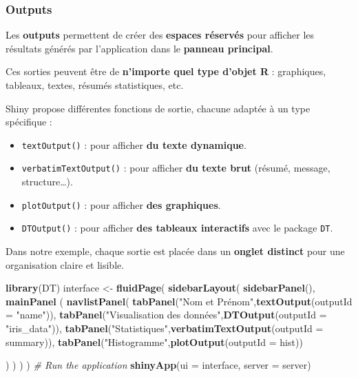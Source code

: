 \documentclass[
]{article}
\newenvironment{Shaded}{\begin{snugshade}}{\end{snugshade}}
\newcommand{\AttributeTok}[1]{\textcolor[rgb]{0.13,0.29,0.53}{#1}}
\newcommand{\CommentTok}[1]{\textcolor[rgb]{0.56,0.35,0.01}{\textit{#1}}}
\newcommand{\FunctionTok}[1]{\textcolor[rgb]{0.13,0.29,0.53}{\textbf{#1}}}
\newcommand{\NormalTok}[1]{#1}
\newcommand{\OtherTok}[1]{\textcolor[rgb]{0.56,0.35,0.01}{#1}}
\newcommand{\StringTok}[1]{\textcolor[rgb]{0.31,0.60,0.02}{#1}}
\providecommand{\tightlist}{%
  \setlength{\itemsep}{0pt}\setlength{\parskip}{0pt}}
\begin{document}
\subsubsection{Outputs}\label{outputs}

Les \textbf{outputs} permettent de créer des \textbf{espaces réservés}
pour afficher les résultats générés par l'application dans le
\textbf{panneau principal}.

Ces sorties peuvent être de \textbf{n'importe quel type d'objet R} :
graphiques, tableaux, textes, résumés statistiques, etc.

Shiny propose différentes fonctions de sortie, chacune adaptée à un type
spécifique :

\begin{itemize}
\tightlist
\item
  \texttt{textOutput()} : pour afficher \textbf{du texte dynamique}.\\
\item
  \texttt{verbatimTextOutput()} : pour afficher \textbf{du texte brut}
  (résumé, message, structure\ldots).\\
\item
  \texttt{plotOutput()} : pour afficher \textbf{des graphiques}.\\
\item
  \texttt{DTOutput()} : pour afficher \textbf{des tableaux interactifs}
  avec le package \texttt{DT}.
\end{itemize}

Dans notre exemple, chaque sortie est placée dans un \textbf{onglet
distinct} pour une organisation claire et lisible.

\begin{Shaded}
\begin{Highlighting}[]
\FunctionTok{library}\NormalTok{(DT)}
\NormalTok{interface }\OtherTok{\textless{}{-}} \FunctionTok{fluidPage}\NormalTok{(}
  \FunctionTok{sidebarLayout}\NormalTok{(}
  \FunctionTok{sidebarPanel}\NormalTok{(),}
\FunctionTok{mainPanel}\NormalTok{ (}
 \FunctionTok{navlistPanel}\NormalTok{(}
    \FunctionTok{tabPanel}\NormalTok{(}\StringTok{"Nom et Prénom"}\NormalTok{,}\FunctionTok{textOutput}\NormalTok{(}\AttributeTok{outputId =} \StringTok{"name"}\NormalTok{)),}
    \FunctionTok{tabPanel}\NormalTok{(}\StringTok{"Visualisation des données"}\NormalTok{,}\FunctionTok{DTOutput}\NormalTok{(}\AttributeTok{outputId =} \StringTok{"iris\_data"}\NormalTok{)),}
    \FunctionTok{tabPanel}\NormalTok{(}\StringTok{"Statistiques"}\NormalTok{,}\FunctionTok{verbatimTextOutput}\NormalTok{(}\AttributeTok{outputId =} \StringTok{\textquotesingle{}summary\textquotesingle{}}\NormalTok{)),}
    \FunctionTok{tabPanel}\NormalTok{(}\StringTok{"Histogramme"}\NormalTok{,}\FunctionTok{plotOutput}\NormalTok{(}\AttributeTok{outputId =} \StringTok{\textquotesingle{}hist\textquotesingle{}}\NormalTok{))}
  
\NormalTok{      )}
\NormalTok{    )}
\NormalTok{  )}
\NormalTok{)}
\CommentTok{\# Run the application }
\FunctionTok{shinyApp}\NormalTok{(}\AttributeTok{ui =}\NormalTok{ interface, }\AttributeTok{server =}\NormalTok{ server)}
\end{Highlighting}
\end{Shaded}
\end{document}
